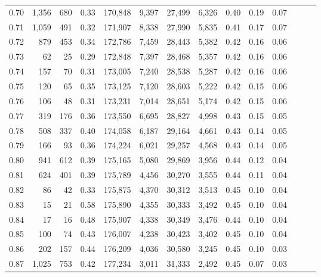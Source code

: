 \begin{tabular}{rrrrrrrrrrrrrr}
0.70 &   1,356 &    680 &  0.33 &  170,848 &    9,397 &  27,499 &   6,326 &  0.40 &  0.19 &      0.07 \\
0.71 &   1,059 &    491 &  0.32 &  171,907 &    8,338 &  27,990 &   5,835 &  0.41 &  0.17 &      0.07 \\
0.72 &     879 &    453 &  0.34 &  172,786 &    7,459 &  28,443 &   5,382 &  0.42 &  0.16 &      0.06 \\
0.73 &      62 &     25 &  0.29 &  172,848 &    7,397 &  28,468 &   5,357 &  0.42 &  0.16 &      0.06 \\
0.74 &     157 &     70 &  0.31 &  173,005 &    7,240 &  28,538 &   5,287 &  0.42 &  0.16 &      0.06 \\
0.75 &     120 &     65 &  0.35 &  173,125 &    7,120 &  28,603 &   5,222 &  0.42 &  0.15 &      0.06 \\
0.76 &     106 &     48 &  0.31 &  173,231 &    7,014 &  28,651 &   5,174 &  0.42 &  0.15 &      0.06 \\
0.77 &     319 &    176 &  0.36 &  173,550 &    6,695 &  28,827 &   4,998 &  0.43 &  0.15 &      0.05 \\
0.78 &     508 &    337 &  0.40 &  174,058 &    6,187 &  29,164 &   4,661 &  0.43 &  0.14 &      0.05 \\
0.79 &     166 &     93 &  0.36 &  174,224 &    6,021 &  29,257 &   4,568 &  0.43 &  0.14 &      0.05 \\
0.80 &     941 &    612 &  0.39 &  175,165 &    5,080 &  29,869 &   3,956 &  0.44 &  0.12 &      0.04 \\
0.81 &     624 &    401 &  0.39 &  175,789 &    4,456 &  30,270 &   3,555 &  0.44 &  0.11 &      0.04 \\
0.82 &      86 &     42 &  0.33 &  175,875 &    4,370 &  30,312 &   3,513 &  0.45 &  0.10 &      0.04 \\
0.83 &      15 &     21 &  0.58 &  175,890 &    4,355 &  30,333 &   3,492 &  0.45 &  0.10 &      0.04 \\
0.84 &      17 &     16 &  0.48 &  175,907 &    4,338 &  30,349 &   3,476 &  0.44 &  0.10 &      0.04 \\
0.85 &     100 &     74 &  0.43 &  176,007 &    4,238 &  30,423 &   3,402 &  0.45 &  0.10 &      0.04 \\
0.86 &     202 &    157 &  0.44 &  176,209 &    4,036 &  30,580 &   3,245 &  0.45 &  0.10 &      0.03 \\
0.87 &   1,025 &    753 &  0.42 &  177,234 &    3,011 &  31,333 &   2,492 &  0.45 &  0.07 &      0.03 \\

\end{tabular}
